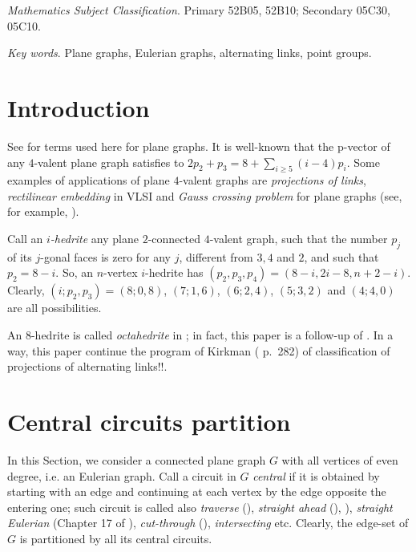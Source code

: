 \documentclass[12pt]{article}
\begin{document}
{\em Mathematics Subject Classification}. Primary 52B05, 52B10;
Secondary 05C30, 05C10.

{\em Key words}. Plane graphs, Eulerian graphs, alternating links, point groups.

\section{Introduction}

See \cite{Gr} for terms used here for plane graphs.
It is well-known that the p-vector of any $4$-valent plane graph satisfies to
$2p_2+p_3=8+ \sum_{i\geq 5} (i-4)p_i$.
Some examples of applications of plane $4$-valent graphs are {\em projections
of links}, {\em rectilinear embedding} in VLSI and {\em Gauss crossing 
problem} for plane graphs (see, for example, \cite{Liu}).

\vspace{2mm}


Call an {\em $i$-hedrite} any plane $2$-connected
$4$-valent graph, such that the number
$p_j$ of its $j$-gonal faces is zero for any $j$, different from 
$3,4$ and $2$, and such that $p_2=8-i$. So, 
an $n$-vertex $i$-hedrite has $(p_2, p_3, p_4)=(8-i, 2i-8, n+2-i)$.
Clearly, $(i;p_2,p_3)=(8;0,8)$, $(7;1,6)$, $(6;2,4)$,
$(5;3,2)$ and $(4;4,0)$ are all possibilities. 

An $8$-hedrite is called {\em octahedrite} in \cite{DSt}; in fact, this paper is a follow-up of \cite{DSt}.
In a way, this paper continue the program of Kirkman (\cite{Kirk} p.~282) of classification of projections of alternating links!!.


















\section{Central circuits partition}

In this Section, we consider a connected plane graph $G$ with all vertices of 
even degree, i.e. an Eulerian graph. 
Call a circuit in $G$ {\it central} if it is obtained by starting with an
edge and continuing at each vertex by the edge opposite the entering one; such 
circuit is called also {\em traverse} 
(\cite{GK}), {\em straight ahead} (\cite{Ha}),  \cite{PTZ}), 
{\em straight Eulerian} (Chapter 17 of \cite{God}), 
{\em cut-through} (\cite{Je}),
{\em intersecting} etc. Clearly, the edge-set of 
$G$ is partitioned by all its central circuits.
\end{document}
